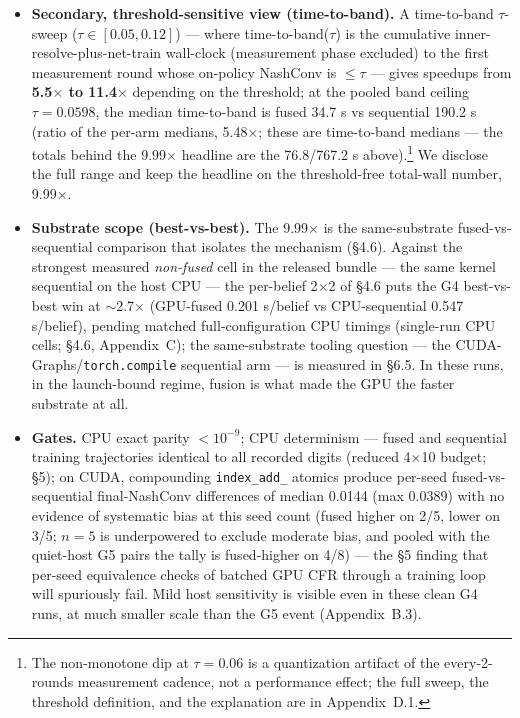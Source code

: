 \documentclass[11pt]{article}
\begin{document}
\begin{itemize}
[10th/90th: 0.0313, 0.0604, derived from the released per-seed artifacts]. The arms
satisfy the \S5 descriptive band criterion --- each arm's median lies within the other
arm's per-seed 10th/90th interval --- and we make no lower-exploitability claim. The
criterion is a descriptive band check at $n{=}5$, not an equivalence test; equivalence
testing in the two one-sided tests (TOST) style is deferred to the pre-registered
full-protocol G5 run.
\item \textbf{Secondary, threshold-sensitive view (time-to-band).} A time-to-band
$\tau$-sweep ($\tau \in [0.05, 0.12]$) --- where time-to-band($\tau$) is the cumulative
inner-resolve-plus-net-train wall-clock (measurement phase excluded) to the first
measurement round whose on-policy NashConv is $\le \tau$ --- gives speedups from
\textbf{5.5$\times$ to 11.4$\times$} depending on the threshold; at the pooled band
ceiling $\tau = 0.0598$, the median time-to-band is fused 34.7 s vs sequential 190.2 s
(ratio of the per-arm medians, 5.48$\times$; these are time-to-band medians --- the
totals behind the 9.99$\times$ headline are the 76.8/767.2 s above).\footnote{The
non-monotone dip at $\tau = 0.06$ is a quantization artifact of the every-2-rounds
measurement cadence, not a performance effect; the full sweep, the threshold definition,
and the explanation are in Appendix~D.1.} We disclose the full range and keep the
headline on the threshold-free total-wall number, 9.99$\times$.
\item \textbf{Substrate scope (best-vs-best).} The 9.99$\times$ is the same-substrate
fused-vs-sequential comparison that isolates the mechanism (\S4.6). Against the
strongest measured \emph{non-fused} cell in the released bundle --- the same kernel sequential on
the host CPU --- the per-belief 2$\times$2 of \S4.6 puts the G4 best-vs-best win at
$\sim$2.7$\times$ (GPU-fused 0.201 s/belief vs CPU-sequential 0.547 s/belief), pending
matched full-configuration CPU timings (single-run CPU cells; \S4.6,
Appendix~C); the same-substrate tooling question --- the
CUDA-Graphs/\texttt{torch.compile} sequential arm --- is measured in \S6.5. In these
runs, in the launch-bound regime, fusion is what made the GPU the faster substrate at
all.
\item \textbf{Gates.} CPU exact parity $<10^{-9}$; CPU determinism --- fused and
sequential training trajectories identical to all recorded digits (reduced 4$\times$10
budget; \S5); on CUDA, compounding \texttt{index\_add\_} atomics produce per-seed
fused-vs-sequential final-NashConv differences of median 0.0144 (max 0.0389) with no
evidence of systematic bias at this seed count (fused higher on 2/5, lower on 3/5; $n{=}5$ is
underpowered to exclude moderate bias, and pooled with the quiet-host G5 pairs the tally
is fused-higher on 4/8) --- the \S5 finding that per-seed equivalence checks of batched
GPU CFR through a training loop will spuriously fail. Mild host sensitivity is visible
even in these clean G4 runs, at much smaller scale than the G5 event (Appendix~B.3).
\end{itemize}
\end{document}
